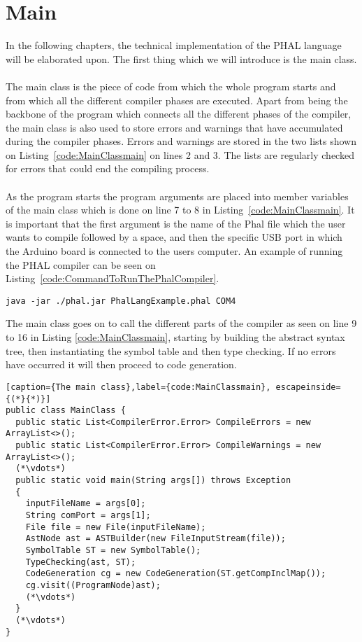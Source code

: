 \chapter{Main}
In the following chapters, the technical implementation of the PHAL language will be elaborated upon.
The first thing which we will introduce is the main class. 
\\\\
The main class is the piece of code from which the whole program starts and from which all the different compiler phases are executed. 
Apart from being the backbone of the program which connects all the different phases of the compiler, the main class is also used to store errors and warnings that have accumulated during the compiler phases. 
Errors and warnings are stored in the two lists shown on Listing~\ref{code:MainClassmain} on lines 2 and 3. The lists are regularly checked for errors that could end the compiling process. 
\\\\
As the program starts the program arguments are placed into member variables of the main class which is done on line 7 to 8 in Listing~\ref{code:MainClassmain}. 
It is important that the first argument is the name of the Phal file which the user wants to compile followed by a space, and then the specific USB port in which the Arduino board is connected to the users computer. 
An example of running the PHAL compiler can be seen on Listing~\ref{code:CommandToRunThePhalCompiler}.
\begin{lstlisting}[caption={Command to run the PHAL compiler}, label={code:CommandToRunThePhalCompiler}]
java -jar ./phal.jar PhalLangExample.phal COM4
\end{lstlisting}
The main class goes on to call the different parts of the compiler as seen on line 9 to 16 in Listing \ref{code:MainClassmain}, starting by building the abstract syntax tree, then instantiating the symbol table and then type checking. If no errors have occurred it will then proceed to code generation.
\begin{lstlisting}[caption={The main class},label={code:MainClassmain}, escapeinside={(*}{*)}]
public class MainClass {
  public static List<CompilerError.Error> CompileErrors = new ArrayList<>();
  public static List<CompilerError.Error> CompileWarnings = new ArrayList<>();
  (*\vdots*)
  public static void main(String args[]) throws Exception
  {
    inputFileName = args[0];
    String comPort = args[1];
    File file = new File(inputFileName);
    AstNode ast = ASTBuilder(new FileInputStream(file));
    SymbolTable ST = new SymbolTable();
    TypeChecking(ast, ST);	
    CodeGeneration cg = new CodeGeneration(ST.getCompInclMap());
    cg.visit((ProgramNode)ast);
    (*\vdots*)
  }
  (*\vdots*)
}
\end{lstlisting}
